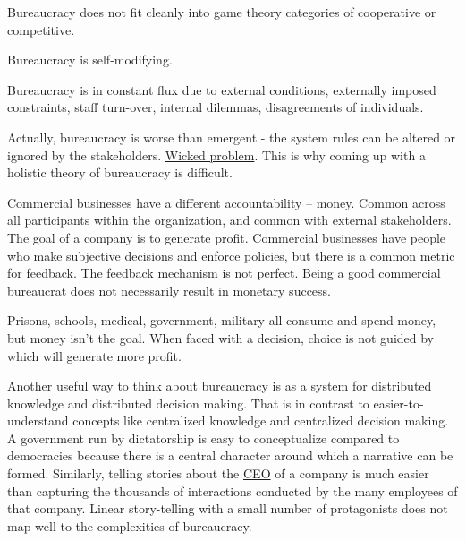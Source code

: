 Bureaucracy does not fit cleanly into game theory categories of cooperative or competitive.

Bureaucracy is self-modifying. 

Bureaucracy is in constant flux due to external conditions, externally imposed constraints, staff turn-over, internal dilemmas, disagreements of individuals. 

Actually, bureaucracy is worse than emergent - the system rules can be altered or ignored by the stakeholders. \href{https://en.wikipedia.org/wiki/Wicked_problem}{Wicked problem}. This is why coming up with a holistic theory of bureaucracy is difficult. 

Commercial businesses have a different accountability -- money. Common across all participants within the organization, and common with external stakeholders. The goal of a company is to generate profit. Commercial businesses have people who make subjective decisions and enforce policies, but there is a common metric for feedback. The feedback mechanism is not perfect. Being a good commercial bureaucrat does not necessarily result in monetary success.

Prisons, schools, medical, government, military all consume and spend money, but money isn't the goal. When faced with a decision, choice is not guided by which will generate more profit. 




Another useful way to think about bureaucracy is as a system for distributed knowledge and distributed decision making. That is in contrast to easier-to-understand concepts like centralized knowledge and centralized decision making. A government run by dictatorship is easy to conceptualize compared to democracies because there is a central character around which a narrative can be formed. Similarly, telling stories about the \href{https://en.wikipedia.org/wiki/Chief_executive_officer}{CEO} of a company is much easier than capturing the thousands of interactions conducted by the many employees of that company. Linear story-telling with a small number of protagonists does not map well to the complexities of bureaucracy. 



